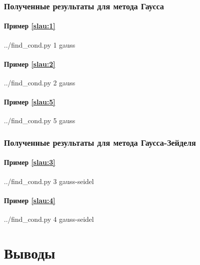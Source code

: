 \documentclass[a4paper]{article}
\begin{document}
\subsubsection{Полученные результаты для метода Гаусса}

\paragraph{Пример \eqref{slau:1}}
\bash[stdout]
../find_cond.py 1 gauss
\END

\paragraph{Пример \eqref{slau:2}}
\bash[stdout]
../find_cond.py 2 gauss
\END

\paragraph{Пример \eqref{slau:5}}
\bash[stdout]
../find_cond.py 5 gauss
\END

\subsubsection{Полученные результаты для метода Гаусса-Зейделя}


\paragraph{Пример \eqref{slau:3}}
\bash[stdout]
../find_cond.py 3 gauss-seidel
\END

\paragraph{Пример \eqref{slau:4}}
\bash[stdout]
../find_cond.py 4 gauss-seidel
\END

\section{Выводы}
\end{document}
